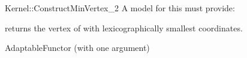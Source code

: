 \begin{ccRefFunctionObjectConcept}{Kernel::ConstructMinVertex_2}
A model for this must provide:




 {returns the vertex of
   with lexicographically smallest coordinates.}


\ccRefines
AdaptableFunctor (with one argument)

\ccSeeAlso
{}

\end{ccRefFunctionObjectConcept}
